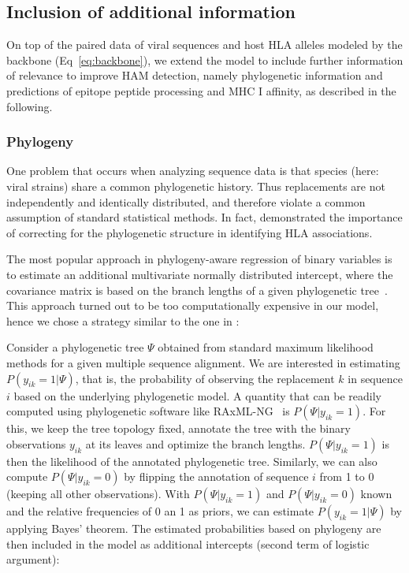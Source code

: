 \documentclass{bioinfo}
\begin{document}
\begin{methods}

\subsection{Inclusion of additional information}

On top of the paired data of viral sequences and host HLA alleles modeled by the backbone (Eq~\ref{eq:backbone}), we extend the model to include further information of relevance to improve HAM detection, namely phylogenetic information and predictions of epitope peptide processing and MHC I affinity, as described in the following.

\subsubsection{Phylogeny}
One problem that occurs when analyzing sequence data is that species (here: viral strains) share a common phylogenetic history. Thus replacements are not independently and identically distributed, and therefore violate a common assumption of standard statistical methods. In fact, \citet{Bhattacharya2007} demonstrated the importance of correcting for the phylogenetic structure in identifying HLA associations.

The most popular approach in phylogeny-aware regression of binary variables is to estimate an additional multivariate normally distributed intercept, where the covariance matrix is based on the branch lengths of a given phylogenetic tree~\citep{Ives2009, Ives2014}.
This approach turned out to be too computationally expensive in our model, hence we chose a strategy similar to the one in \citet{Carlson2008}:

Consider a phylogenetic tree \(\Psi\) obtained from standard maximum likelihood methods for a given multiple sequence alignment. We are interested in estimating \(P(y_{ik}=1|\Psi)\), that is, the probability of observing the replacement \(k\) in sequence \(i\) based on the underlying phylogenetic model. A quantity that can be readily computed using phylogenetic software like RAxML-NG~\citep{Kozlov2019} is \(P(\Psi|y_{ik}=1)\). For this, we keep the tree topology fixed, annotate the tree with the binary observations \(y_{ik}\) at its leaves and optimize the branch lengths. \(P(\Psi|y_{ik}=1)\) is then the likelihood of the annotated phylogenetic tree. Similarly, we can also compute \(P(\Psi|y_{ik}=0)\) by flipping the annotation of sequence $i$ from 1 to 0 (keeping all other observations). With  $P(\Psi|y_{ik}=1)$ and $P(\Psi|y_{ik}=0)$ known and the relative frequencies of 0 an 1 as priors, we can estimate $P(y_{ik}=1|\Psi)$ by applying Bayes' theorem. The estimated probabilities based on phylogeny are then included in the model as additional intercepts (second term of logistic argument):


\end{methods}
\end{document}
